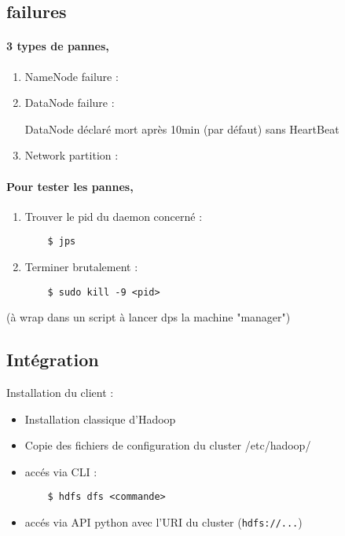 \subsection{failures}

\paragraph{3 types de pannes,}
\begin{enumerate}
	\item NameNode failure :


	\item DataNode failure :

	DataNode déclaré mort après 10min (par défaut) sans HeartBeat

	\item Network partition :
\end{enumerate}

\paragraph{Pour tester les pannes,}
\begin{enumerate}
	\item Trouver le pid du daemon concerné :
	\begin{lstlisting}
	$ jps
	\end{lstlisting}
	\item Terminer brutalement :
	\begin{lstlisting}
	$ sudo kill -9 <pid>
	\end{lstlisting}
\end{enumerate}
(à wrap dans un script à lancer dps la machine "manager")


\subsection{Intégration}
Installation du client :
\begin{itemize}
	\item Installation classique d'Hadoop
	\item Copie des fichiers de configuration du cluster /etc/hadoop/
	\item accés via CLI : 
	\begin{lstlisting}
	$ hdfs dfs <commande>
	\end{lstlisting}
	\item accés via API python avec l'URI du cluster (\texttt{hdfs://...})
\end{itemize}

